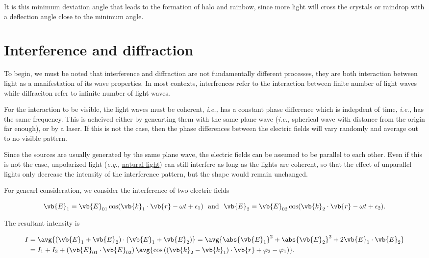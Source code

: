 \documentclass[english,a4paper,12pt]{report}
\begin{document}
It is this minimum deviation angle that leads to the formation of halo and rainbow, since more light will cross the crystals or raindrop with a deflection angle close to the minimum angle.



\chapter{Interference and diffraction}

To begin, we must be noted that interference and diffraction are not fundamentally different processes, they are both interaction between light as a manifestation of its wave properties. In most contexts, interfrences refer to the interaction between finite number of light waves while diffraciton refer to infinite number of light waves.

For the interaction to be visible, the light waves must be coherent, \textit{i.e.,} has a constant phase difference which is indepdent of time, \textit{i.e.,} has the same frequency. This is acheived either by genearting them with the same plane wave (\textit{i.e.,} spherical wave with distance from the origin far enough), or by a laser. If this is not the case, then the phase differences between the electric fields will vary randomly and average out to no visible pattern.

Since the sources are usually generated by the same plane wave, the electric fields can be assumed to be parallel to each other. Even if this is not the case, unpolarized light (\textit{e.g.,} \href{https://www.youtube.com/watch?v=Iuv6hY6zsd0&t=326s}{natural light}) can still interfere as long as the lights are coherent, so that the effect of unparallel lights only decrease the intensity of the interference pattern, but the shape would remain unchanged.  

For genearl consideration, we consider the interference of two electric fields 

\begin{equation}
    \vb{E} _{1} = \vb{E} _{01} \cos (\vb{k}_{1}  \cdot \vb{r} - \omega t + \epsilon _{1} ) ~\text { and }~ \vb{E} _{2} = \vb{E} _{02} \cos (\vb{k}_{2}  \cdot \vb{r} - \omega t + \epsilon _{2} ).    
\end{equation}

The resultant intensity is 

\begin{equation}
    \begin{aligned} 
    I &= \avg{(\vb{E} _{1} + \vb{E} _{2}  ) \cdot (\vb{E} _{1} + \vb{E} _{2}  )} = \avg{\abs{\vb{E} _{1} }^2 + \abs{\vb{E} _{2} }^2 + 2 \vb{E} _{1} \cdot \vb{E} _{2}    } \\ &= I_1 + I_2 + \left( \vb{E} _{01} \cdot \vb{E} _{02}   \right) \avg{\cos \left( \left( \vb{k} _{2} - \vb{k} _{1}   \right) \cdot \vb{r} + \varphi _{2} - \varphi _{1}   \right)}.
    \end{aligned} 
\end{equation}
\end{document}

